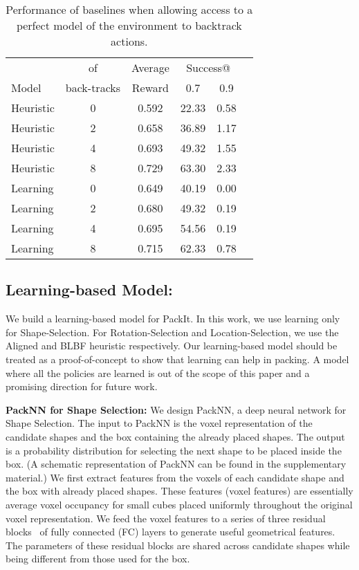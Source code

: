 \documentclass{article}
\begin{document}
\begin{table}[t]
    \centering
    \begin{center}
    \begin{tabular}{l||c|c|ccc}
    \hline
          &  of & Average & \multicolumn{2}{c}{Success@}  \\
    Model  & back-tracks & Reward  & 0.7 & 0.9 \\
     \hline \hline
    Heuristic & 0 & 0.592 & 22.33 & 0.58 \\
    Heuristic & 2 & 0.658 & 36.89 & 1.17 \\
    Heuristic & 4 & 0.693 & 49.32 & 1.55 \\
    Heuristic & 8 & 0.729 & 63.30 & 2.33 \\
    \hline
    Learning  & 0 & 0.649 & 40.19 & 0.00 \\
    Learning  & 2 & 0.680 & 49.32 & 0.19 \\
    Learning  & 4 & 0.695 & 54.56 & 0.19 \\
    Learning  & 8 & 0.715 & 62.33 & 0.78 \\
    \hline
    \end{tabular}
    \end{center}
    \caption{Performance of baselines when allowing access to a perfect model of the environment to backtrack actions{\footnotemark[3]}.}
    \label{tab:backtrack}
\end{table}
\subsection{Learning-based Model:}
We build a learning-based model for PackIt. In this work, we use learning only for Shape-Selection. For Rotation-Selection and Location-Selection, we use the Aligned and BLBF heuristic respectively. Our learning-based model should be treated as a proof-of-concept to show that learning can help in packing. A model where all the policies are learned is out of the scope of this paper and a promising direction for future work. 

\noindent\textbf{PackNN for Shape Selection:} We design PackNN, a deep neural network for Shape Selection. The input to PackNN is the voxel representation of the candidate shapes and the box containing the already placed shapes. The output is a probability distribution for selecting the next shape to be placed inside the box. (A schematic representation of PackNN can be found in the supplementary material.) We first extract features from the voxels of each candidate shape and the box with already placed shapes. These features (voxel features) are essentially average voxel occupancy for small cubes placed uniformly throughout the original  voxel representation. We feed the voxel features to a series of three residual blocks~\cite{he2016deep} of fully connected (FC) layers to generate useful geometrical features. The parameters of these residual blocks are shared across candidate shapes while being different from those used for the box. 
\end{document}
